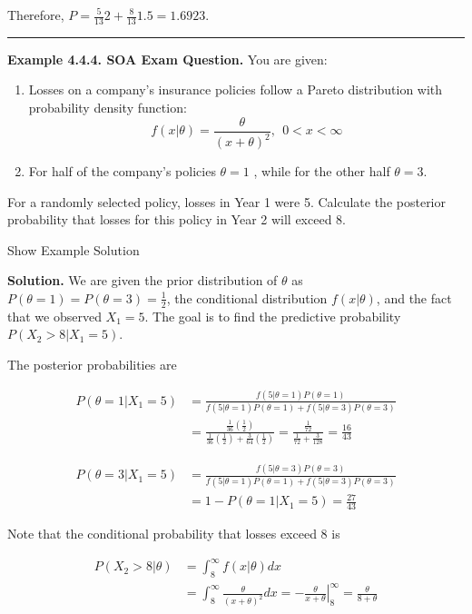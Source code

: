 \documentclass[]{book}
\providecommand{\tightlist}{%
  \setlength{\itemsep}{0pt}\setlength{\parskip}{0pt}}
\theoremstyle{definition}
\theoremstyle{definition}
\theoremstyle{definition}
\theoremstyle{remark}
\begin{document}
Therefore, \(P=\frac{5}{13}2 + \frac{8}{13}1.5 = 1.6923\).

\begin{center}\rule{0.5\linewidth}{\linethickness}\end{center}

\textbf{Example 4.4.4. SOA Exam Question.} You are given:

\begin{enumerate}
\def\labelenumi{(\roman{enumi})}
\tightlist
\item
  Losses on a company's insurance policies follow a Pareto distribution
  with probability density function:
  \[f(x|\theta) = \frac{\theta}{(x+\theta)^2}, \ \ 0 < x < \infty\]
\item
  For half of the company's policies \(\theta=1\) , while for the other
  half \(\theta=3\).
\end{enumerate}

For a randomly selected policy, losses in Year 1 were 5. Calculate the
posterior probability that losses for this policy in Year 2 will exceed
8.

Show Example Solution

\hypertarget{toggleExampleSelect.4.4}{}
\textbf{Solution.} We are given the prior distribution of \(\theta\) as
\(P(\theta=1)=P(\theta=3)=\frac{1}{2}\), the conditional distribution
\(f(x|\theta)\), and the fact that we observed \(X_1=5\). The goal is to
find the predictive probability \(P(X_2>8|X_1=5)\).

The posterior probabilities are

\[\begin{aligned}
P(\theta=1|X_1=5) &= \frac{f(5|\theta=1)P(\theta=1)}{f(5|\theta=1)P(\theta=1) + f(5|\theta=3)P(\theta=3)} \\
&= \frac{\frac{1}{36}(\frac{1}{2})}{\frac{1}{36}(\frac{1}{2})+\frac{3}{64}(\frac{1}{2})} = \frac{\frac{1}{72}}{\frac{1}{72} + \frac{3}{128}} = \frac{16}{43}
\end{aligned}\]

\[\begin{aligned}
P(\theta=3|X_1=5) &= \frac{f(5|\theta=3)P(\theta=3)}{f(5|\theta=1)P(\theta=1) + f(5|\theta=3)P(\theta=3)} \\
&= 1-P(\theta=1|X_1=5) = \frac{27}{43}
\end{aligned}\]

Note that the conditional probability that losses exceed 8 is

\[\begin{aligned}
P(X_2>8|\theta) &= \int_8^\infty f(x|\theta)dx \\
&= \int_8^\infty \frac{\theta}{(x+\theta)^2}dx = \left. -\frac{\theta}{x+\theta} \right|_8^\infty = \frac{\theta}{8 + \theta}
\end{aligned}\]
\end{document}

